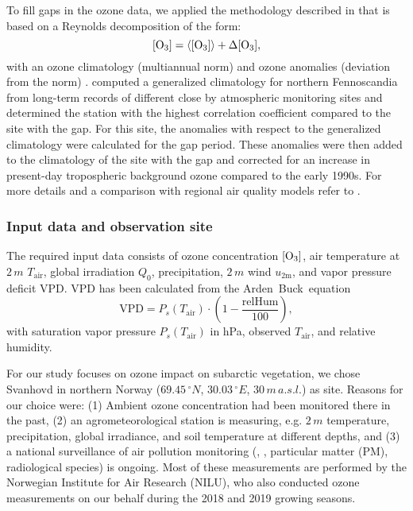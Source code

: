 \documentclass[bg, manuscript]{copernicus}
\begin{document}
To fill gaps in the ozone data, we applied the methodology described in \citet{ACP:Falk2021} that is based on a Reynolds decomposition of the form:
\begin{equation}
  \chem{[O_3]} = \chem{\left<[O_3]\right>} + \chem{\Delta[O_3]},
  \label{eq:reynolds_decomp}
\end{equation}
with an ozone climatology (multiannual norm) \chem{\left<[O_3]\right>} and ozone anomalies (deviation from the norm) \chem{\Delta[O_3]}. \citet{ACP:Falk2021} computed a generalized climatology for northern Fennoscandia from long-term records of different close by atmospheric monitoring sites and determined the station with the highest correlation coefficient compared to the site with the gap. For this site, the anomalies with respect to the generalized climatology were calculated for the gap period. These anomalies were then added to the climatology of the site with the gap and corrected for an increase in present-day tropospheric background ozone compared to the early 1990s. For more details and a comparison with regional air quality models refer to \citet{ACP:Falk2021}.

\subsubsection{Input data and observation site}
\label{subsec:data}
The required input data consists of ozone concentration $\chem{[O_3]}$, air temperature at $2\,\unit{m}$ $T_\mathrm{air}$, global irradiation $Q_0$, precipitation, $2\,\unit{m}$ wind $u_\mathrm{2m}$, and vapor pressure deficit VPD. VPD has been calculated from the Arden~Buck~equation~\citep{JAP:Buck1981, Buck2012}
\begin{equation}
  \mathrm{VPD} = P_s(T_\mathrm{air}) \cdot \left(1-\frac{\mathrm{relHum}}{100}\right),
\end{equation}
with saturation vapor pressure $P_s(T_\mathrm{air})$ in \unit{hPa}, observed $T_\mathrm{air}$, and relative humidity.
 
For our study focuses on ozone impact on subarctic vegetation, we chose Svanhovd in northern Norway ($69.45\,\unit{^\circ N}$, $30.03\,\unit{^\circ E}$, $30\,\unit{m\,a.s.l.}$) as site. Reasons for our choice were: (1) Ambient ozone concentration had been monitored there in the past, (2) an agrometeorological station is measuring, e.g. $2\,\unit{m}$ temperature, precipitation, global irradiance, and soil temperature at different depths, and (3) a national surveillance of air pollution monitoring (, , particular matter (PM), radiological species) is ongoing. Most of these measurements are performed by the Norwegian Institute for Air Research (NILU), who also conducted ozone measurements on our behalf during the 2018 and 2019 growing seasons. 
\end{document}
